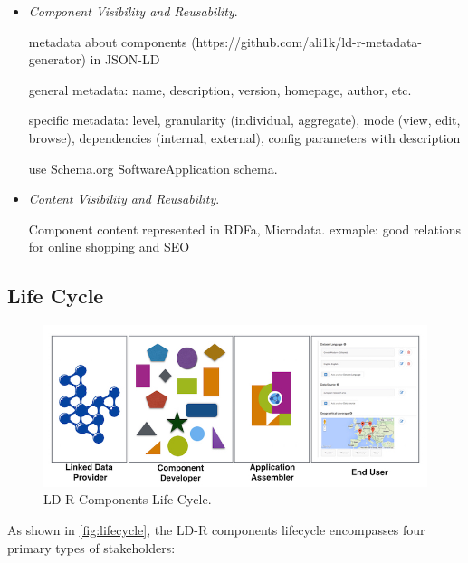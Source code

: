 \documentclass{acm_proc_article-sp}
\begin{document}
\begin{itemize}
\item \emph{Component Visibility and Reusability}.

metadata about components (https://github.com/ali1k/ld-r-metadata-generator) in JSON-LD

general metadata: name, description, version, homepage, author, etc.

specific metadata: level, granularity (individual, aggregate), mode (view, edit, browse), dependencies (internal, external), config parameters with description

use Schema.org SoftwareApplication schema.

\item \emph{Content Visibility and Reusability}.

Component content represented in RDFa, Microdata. exmaple: good relations for online shopping and SEO



\end{itemize}



\subsection{Life Cycle}

\begin{figure}[tb]
  \includegraphics[width=1\linewidth]{images/lifecycle.jpg}
  \caption{LD-R Components Life Cycle.}
  \label{fig:lifecycle}
\end{figure}

As shown in \autoref{fig:lifecycle}, the LD-R components lifecycle encompasses four primary types of stakeholders:
\end{document}
